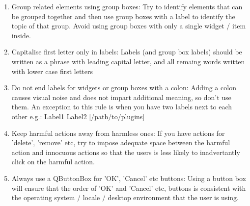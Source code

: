  \begin{enumerate}
 \item Group related elements using group boxes:
   Try to identify elements that can be grouped together and then use group
   boxes with a label to identify the topic of that group.  Avoid using group
   boxes with only a single widget / item inside.
 \item Capitalise first letter only in labels:
   Labels (and group box labels) should be written as a phrase with leading
   capital letter, and all remaing words written with lower case first letters 
 \item Do not end labels for widgets or group boxes with a colon:
   Adding a colon causes visual noise and does not impart additional meaning,
   so don't use them. An exception to this rule is when you have two labels next
   to each other e.g.: Label1  Label2 [/path/to/plugins]
 \item Keep harmful actions away from harmless ones:
   If you have actions for 'delete', 'remove' etc, try to impose adequate space
   between the harmful action and innocuous actions so that the users is less
   likely to inadvertantly click on the harmful action.
 \item Always use a QButtonBox for 'OK', 'Cancel' etc buttons:
   Using a button box will ensure that the order of 'OK' and 'Cancel' etc,
   buttons is consistent with the operating system / locale / desktop
   environment that the user is using.
 \end{enumerate}


